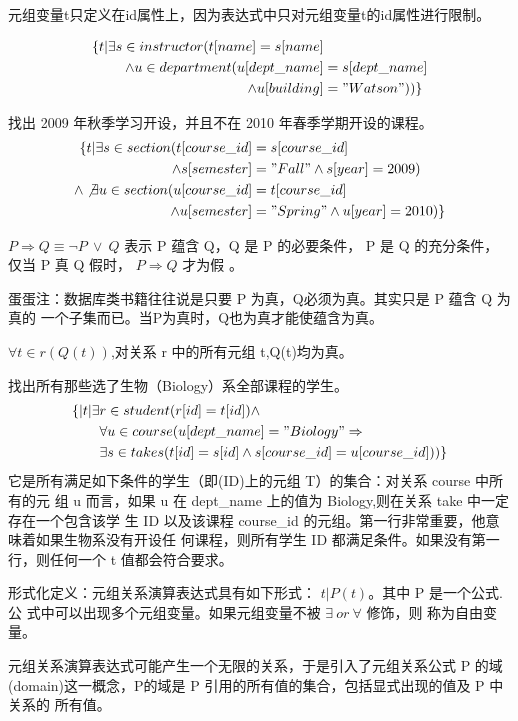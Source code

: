 \documentclass{dingjia}
\begin{document}
元组变量t只定义在id属性上，因为表达式中只对元组变量t的id属性进行限制。

\begin{align}
\{t | \exists s \in instructor ( t[name]  = s[name] & \notag \\
\land u \in department(u[dept\_name] & = s[dept\_name] \notag \\ \land u[building]  & = "Watson"))  \}
\end{align}

找出 2009 年秋季学习开设，并且不在 2010 年春季学期开设的课程。
\begin{align}
\{t | \exists s \in section( t[course\_id]  & = s[course\_id]  \notag \\
\land s[semester] & = "Fall" \land s[year] = 2009) \notag \\
 \land \not \exists u \in section( u[course\_id]  & = t[course\_id]  \notag \\
\land u[semester] & = "Spring" \land u[year] = 2010)  \}
\end{align}

$P \Rightarrow Q \equiv \lnot P \ \lor \ Q$ 表示 P 蕴含 Q，Q 是 P 的必要条件，
P 是 Q 的充分条件，仅当 P 真 Q 假时， $P \Rightarrow Q$ 才为假 。

蛋蛋注：数据库类书籍往往说是只要 P 为真，Q必须为真。其实只是 P 蕴含 Q 为真的
一个子集而已。当P为真时，Q也为真才能使蕴含为真。

$\forall t \in r (Q(t))$,对关系 r 中的所有元组 t,Q(t)均为真。

找出所有那些选了生物（Biology）系全部课程的学生。
\begin{align}
\{|t| \exists & r \in student(r[id] = t[id]) \land  \notag \\
& \forall u \in course(u[dept\_name] = "Biology" \Rightarrow \notag \\
& \exists s \in takes( t[id] = s[id] \land s[course\_id] = u[course\_id]))\}
\end{align}
它是所有满足如下条件的学生（即(ID)上的元组 T）的集合：对关系 course 中所有的元
组 u 而言，如果 u 在 dept\_name 上的值为 Biology,则在关系 take 中一定存在一个包含该学
生 ID 以及该课程 course\_id 的元组。第一行非常重要，他意味着如果生物系没有开设任
何课程，则所有学生 ID 都满足条件。如果没有第一行，则任何一个 t 值都会符合要求。

形式化定义：元组关系演算表达式具有如下形式： ${t|P(t)}$。其中 P 是一个公式.公
式中可以出现多个元组变量。如果元组变量不被 $\exists \ or \ \forall$ 修饰，则
称为自由变量。

元组关系演算表达式可能产生一个无限的关系，于是引入了元组关系公式 P 的域
(domain)这一概念，P的域是 P 引用的所有值的集合，包括显式出现的值及 P 中关系的
所有值。
\end{document}
